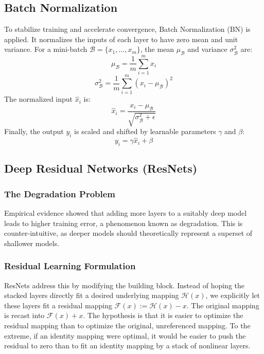 \documentclass[journal]{IEEEtran}
\begin{document}
\subsection{Batch Normalization}
To stabilize training and accelerate convergence, Batch Normalization (BN) is applied. It normalizes the inputs of each layer to have zero mean and unit variance. For a mini-batch $\mathcal{B} = \{x_1, \dots, x_m\}$, the mean $\mu_{\mathcal{B}}$ and variance $\sigma_{\mathcal{B}}^2$ are:
\begin{equation}
\mu_{\mathcal{B}} = \frac{1}{m} \sum_{i=1}^{m} x_i
\end{equation}
\begin{equation}
\sigma_{\mathcal{B}}^2 = \frac{1}{m} \sum_{i=1}^{m} (x_i - \mu_{\mathcal{B}})^2
\end{equation}
The normalized input $\hat{x}_i$ is:
\begin{equation}
\hat{x}_i = \frac{x_i - \mu_{\mathcal{B}}}{\sqrt{\sigma_{\mathcal{B}}^2 + \epsilon}}
\end{equation}
Finally, the output $y_i$ is scaled and shifted by learnable parameters $\gamma$ and $\beta$:
\begin{equation}
y_i = \gamma \hat{x}_i + \beta
\end{equation}

\subsection{Deep Residual Networks (ResNets)}
\subsubsection{The Degradation Problem}
Empirical evidence showed that adding more layers to a suitably deep model leads to higher training error, a phenomenon known as degradation. This is counter-intuitive, as deeper models should theoretically represent a superset of shallower models.

\subsubsection{Residual Learning Formulation}
ResNets address this by modifying the building block. Instead of hoping the stacked layers directly fit a desired underlying mapping $\mathcal{H}(x)$, we explicitly let these layers fit a residual mapping $\mathcal{F}(x) := \mathcal{H}(x) - x$. The original mapping is recast into $\mathcal{F}(x) + x$.
The hypothesis is that it is easier to optimize the residual mapping than to optimize the original, unreferenced mapping. To the extreme, if an identity mapping were optimal, it would be easier to push the residual to zero than to fit an identity mapping by a stack of nonlinear layers.
\end{document}
